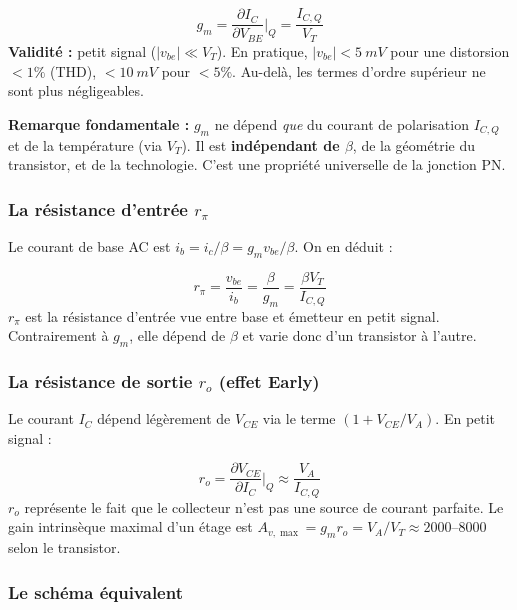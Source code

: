 \documentclass[12pt,a4paper,twoside]{book}
\begin{document}
\begin{formule}
\[
\boxed{g_m = \frac{\partial I_C}{\partial V_{BE}}\bigg|_Q = \frac{I_{C,Q}}{V_T}}
\]
\textbf{Validité :} petit signal ($|v_{be}| \ll V_T$). En pratique, $|v_{be}| < \SI{5}{mV}$ pour une distorsion $< 1\%$ (THD), $< \SI{10}{mV}$ pour $< 5\%$. Au-delà, les termes d'ordre supérieur ne sont plus négligeables.

\textbf{Remarque fondamentale :} $g_m$ ne dépend \textit{que} du courant de polarisation $I_{C,Q}$ et de la température (via $V_T$). Il est \textbf{indépendant de $\beta$}, de la géométrie du transistor, et de la technologie. C'est une propriété universelle de la jonction PN.
\end{formule}

\subsubsection*{La résistance d'entrée $r_\pi$}

Le courant de base AC est $i_b = i_c/\beta = g_m v_{be}/\beta$. On en déduit :

\begin{formule}
\[
\boxed{r_\pi = \frac{v_{be}}{i_b} = \frac{\beta}{g_m} = \frac{\beta V_T}{I_{C,Q}}}
\]
$r_\pi$ est la résistance d'entrée vue entre base et émetteur en petit signal. Contrairement à $g_m$, elle dépend de $\beta$ et varie donc d'un transistor à l'autre.
\end{formule}

\subsubsection*{La résistance de sortie $r_o$ (effet Early)}

Le courant $I_C$ dépend légèrement de $V_{CE}$ via le terme $(1 + V_{CE}/V_A)$. En petit signal :

\begin{formule}
\[
\boxed{r_o = \frac{\partial V_{CE}}{\partial I_C}\bigg|_Q \approx \frac{V_A}{I_{C,Q}}}
\]
$r_o$ représente le fait que le collecteur n'est pas une source de courant parfaite. Le gain intrinsèque maximal d'un étage est $A_{v,\max} = g_m r_o = V_A/V_T \approx 2000$--$8000$ selon le transistor.
\end{formule}

\subsubsection*{Le schéma équivalent}
\end{document}

